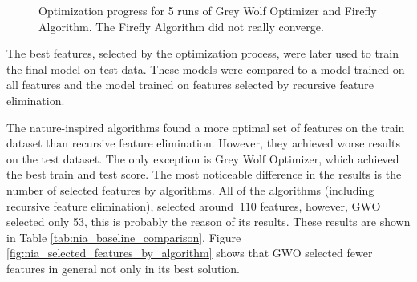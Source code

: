 \documentclass[runningheads]{llncs}
\begin{document}

\begin{figure}
    \centering
    \qquad
    \caption{Optimization progress for 5 runs of Grey Wolf Optimizer and Firefly Algorithm. The Firefly Algorithm did not really converge.}
    \label{fig:nia_scores_by_run}
\end{figure}

The best features, selected by the optimization process, were later used to train the final model on test data. These models were compared to a model trained on all features and the model trained on features selected by recursive feature elimination.

The nature-inspired algorithms found a more optimal set of features on the train dataset than recursive feature elimination. However, they achieved worse results on the test dataset. The only exception is Grey Wolf Optimizer, which achieved the best train and test score. The most noticeable difference in the results is the number of selected features by algorithms. All of the algorithms (including recursive feature elimination), selected around $~110$ features, however, GWO selected only 53, this is probably the reason of its results. These results are shown in Table \ref{tab:nia_baseline_comparison}. Figure \ref{fig:nia_selected_features_by_algorithm} shows that GWO selected fewer features in general not only in its best solution.
\end{document}
